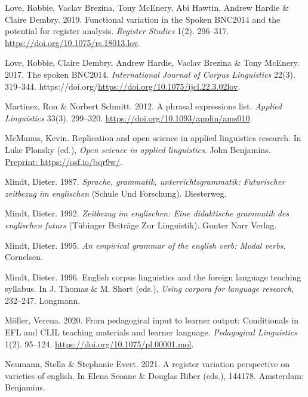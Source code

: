 \documentclass[
  letterpaper,
  DIV=11,
  numbers=noendperiod]{scrreprt}
\newlength{\cslhangindent}
\newenvironment{CSLReferences}[2] %
 {\begin{list}{}{%
  \setlength{\itemindent}{0pt}
  \setlength{\leftmargin}{0pt}
  \setlength{\parsep}{0pt}
  \ifodd #1
   \setlength{\leftmargin}{\cslhangindent}
   \setlength{\itemindent}{-1\cslhangindent}
  \fi
  \setlength{\itemsep}{#2\baselineskip}}}
 {\end{list}}
\begin{document}
\begin{CSLReferences}{1}{0}
Love, Robbie, Vaclav Brezina, Tony McEnery, Abi Hawtin, Andrew Hardie \&
Claire Dembry. 2019. Functional variation in the Spoken BNC2014 and the
potential for register analysis. \emph{Register Studies} 1(2). 296--317.
\url{https://doi.org/10.1075/rs.18013.lov}.

Love, Robbie, Claire Dembry, Andrew Hardie, Vaclav Brezina \& Tony
McEnery. 2017. The spoken BNC2014. \emph{International Journal of Corpus
Linguistics} 22(3). 319--344.
https://doi.org/\url{https://doi.org/10.1075/ijcl.22.3.02lov}.

Martinez, Ron \& Norbert Schmitt. 2012. A phrasal expressions list.
\emph{Applied Linguistics} 33(3). 299--320.
\url{https://doi.org/10.1093/applin/ams010}.

McManus, Kevin. Replication and open science in applied linguistics
research. In Luke Plonsky (ed.), \emph{Open science in applied
linguistics}. John Benjamins.
\href{Preprint:\%20https://osf.io/bqr9w/}{Preprint:
https://osf.io/bqr9w/}.

Mindt, Dieter. 1987. \emph{Sprache, grammatik, unterrichtsgrammatik:
Futurischer zeitbezug im englischen} (Schule Und Forschung). Diesterweg.

Mindt, Dieter. 1992. \emph{Zeitbezug im englischen: Eine didaktische
grammatik des englischen futurs} (Tübinger Beiträge Zur Linguistik).
Gunter Narr Verlag.

Mindt, Dieter. 1995. \emph{An empirical grammar of the english verb:
Modal verbs}. Cornelsen.

Mindt, Dieter. 1996. English corpus linguistics and the foreign language
teaching syllabus. In J. Thomas \& M. Short (eds.), \emph{Using corpora
for language research}, 232--247. Longmann.

Möller, Verena. 2020. From pedagogical input to learner output:
Conditionals in EFL and CLIL teaching materials and learner language.
\emph{Pedagogical Linguistics} 1(2). 95--124.
\url{https://doi.org/10.1075/pl.00001.mol}.

Neumann, Stella \& Stephanie Evert. 2021. A register variation
perspective on varieties of english. In Elena Seoane \& Douglas Biber
(eds.), 144178. Amsterdam: Benjamins.


\end{CSLReferences}
\end{document}
